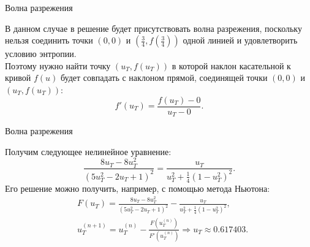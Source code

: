 \documentclass[10pt,xcolor=pst,aspectratio=169]{beamer}
\begin{document}
\begin{frame}{Волна разрежения}

	\transdissolve[duration=0.1]
	\justifying
	\large
	В данном случае в решение будет присутствовать волна разрежения, поскольку нельзя соединить точки $(0,0)$ и $\left( \frac{3}{4},f \left( \frac{3}{4} \right) \right)$ одной линией и удовлетворить условию энтропии.\\
	Поэтому нужно найти точку $\left( u_{T}, f \left( u_{T} \right) \right)$ в которой наклон касательной к кривой $f(u)$ будет совпадать с наклоном прямой, соединящей точки $(0,0)$ и $\left( u_{T}, f \left( u_{T} \right) \right)$:
	\[
		f' \left( u_{T} \right) = \frac{f \left( u_{T} \right) - 0}{u_{T} - 0}.
	\]

\end{frame}

\begin{frame}{Волна разрежения}

	\transdissolve[duration=0.1]
	\justifying
	\large
	Получим следующее нелинейное уравнение:
	\[
		\frac{8 u_{T} - 8 u_{T}^2}{\left( 5 u_{T}^{2} - 2 u_{T} + 1 \right)^{2}} = \frac{u_{T}}{u_{T}^{2} + \frac{1}{4} \left(1 - u_{T}^{2} \right)^{2}}.
	\]
	Его решение можно получить, например, с помощью метода Ньютона:
	\[
		\begin{split}
			&F \left( u_{T} \right) = \frac{8 u_{T} - 8 u_{T}^2}{\left( 5 u_{T}^{2} - 2 u_{T} + 1 \right)^{2}} - \frac{u_{T}}{u_{T}^{2} + \frac{1}{4} \left(1 - u_{T}^{2} \right)^{2}},\\
			& u_{T}^{(n + 1)} = u_{T}^{(n)} - \frac{ F \left( u_{T}^{(n)} \right)}{F' \left( u_{T}^{(n)} \right)} \Rightarrow u_{T} \approx 0.617403.
		\end{split}
	\]

\end{frame}
\end{document}
